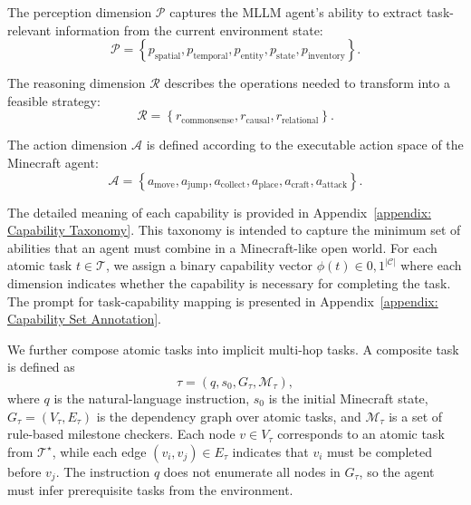 \documentclass[11pt]{article}
\begin{document}
The perception dimension $\mathcal{P}$ captures the MLLM agent's ability to extract task-relevant information from the current environment state:
\begin{equation}
    \mathcal{P} = \left\{p_{\mathrm{spatial}}, p_{\mathrm{temporal}}, p_{\mathrm{entity}}, p_{\mathrm{state}}, p_{\mathrm{inventory}}\right\}.
\end{equation}

The reasoning dimension $\mathcal{R}$ describes the operations needed to transform into a feasible strategy:
\begin{equation}
    \mathcal{R} = \left\{r_{\mathrm{commonsense}}, r_{\mathrm{causal}}, r_{\mathrm{relational}}\right\}.
\end{equation}

The action dimension $\mathcal{A}$ is defined according to the executable action space of the Minecraft agent:
\begin{equation}
\mathcal{A} = \left\{a_{\mathrm{move}}, a_{\mathrm{jump}}, a_{\mathrm{collect}}, a_{\mathrm{place}}, a_{\mathrm{craft}}, a_{\mathrm{attack}}\right\}.
\end{equation}

The detailed meaning of each capability is provided in Appendix~\ref{appendix: Capability Taxonomy}. 
This taxonomy is intended to capture the minimum set of abilities that an agent must combine in a Minecraft-like open world. 
For each atomic task $t \in \mathcal{T}$, we assign a binary capability vector $\phi(t) \in {0,1}^{|\mathcal{C}|}$ where each dimension indicates whether the capability is necessary for completing the task. 
The prompt for task-capability mapping is presented in Appendix~\ref{appendix: Capability Set Annotation}.

We further compose atomic tasks into implicit multi-hop tasks. 
A composite task is defined as
\begin{equation}
    \tau = (q, s_0, G_{\tau}, \mathcal{M}_{\tau}),
\end{equation}
where $q$ is the natural-language instruction, $s_0$ is the initial Minecraft
state, $G_{\tau}=(V_{\tau},E_{\tau})$ is the dependency graph over atomic tasks, and $\mathcal{M}_{\tau}$ is a set of rule-based milestone checkers. 
Each node $v \in V_{\tau}$ corresponds to an atomic task from
$\mathcal{T}^{\star}$, while each edge $(v_i, v_j)\in E_{\tau}$ indicates that
$v_i$ must be completed before $v_j$. 
The instruction $q$ does not enumerate all nodes in $G_{\tau}$, so the agent must infer prerequisite tasks from the environment.
\end{document}
